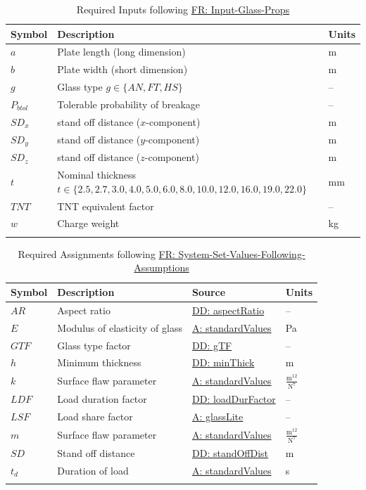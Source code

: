\documentclass[12pt]{article}
\begin{document}
\begin{longtabu}{l X[l] l}
\toprule
\textbf{Symbol} & \textbf{Description} & \textbf{Units}
\\
\midrule
\endhead
$a$ & Plate length (long dimension) & m
\\
$b$ & Plate width (short dimension) & m
\\
$g$ & Glass type $g\in{}\{AN,FT,HS\}$ & --
\\
${P_{btol}}$ & Tolerable probability of breakage & --
\\
${SD_{x}}$ & stand off distance ($x$-component) & m
\\
${SD_{y}}$ & stand off distance ($y$-component) & m
\\
${SD_{z}}$ & stand off distance ($z$-component) & m
\\
$t$ & Nominal thickness $t\in{}\{2.5,2.7,3.0,4.0,5.0,6.0,8.0,10.0,12.0,16.0,19.0,22.0\}$ & mm
\\
$TNT$ & TNT equivalent factor & --
\\
$w$ & Charge weight & kg
\\
\bottomrule
\caption{Required Inputs following \hyperref[inputGlassProps]{FR: Input-Glass-Props}}
\label{Table:ReqInputs}
\end{longtabu}
\begin{longtable}{l l l l}
\toprule
\textbf{Symbol} & \textbf{Description} & \textbf{Source} & \textbf{Units}
\\
\midrule
\endhead
$AR$ & Aspect ratio & \hyperref[DD:aspectRatio]{DD: aspectRatio} & --
\\
$E$ & Modulus of elasticity of glass & \hyperref[assumpSV]{A: standardValues} & Pa
\\
$GTF$ & Glass type factor & \hyperref[DD:gTF]{DD: gTF} & --
\\
$h$ & Minimum thickness & \hyperref[DD:minThick]{DD: minThick} & m
\\
$k$ & Surface flaw parameter & \hyperref[assumpSV]{A: standardValues} & $\frac{\text{m}^{12}}{\text{N}^{7}}$
\\
$LDF$ & Load duration factor & \hyperref[DD:loadDurFactor]{DD: loadDurFactor} & --
\\
$LSF$ & Load share factor & \hyperref[assumpGL]{A: glassLite} & --
\\
$m$ & Surface flaw parameter & \hyperref[assumpSV]{A: standardValues} & $\frac{\text{m}^{12}}{\text{N}^{7}}$
\\
$SD$ & Stand off distance & \hyperref[DD:standOffDist]{DD: standOffDist} & m
\\
${t_{d}}$ & Duration of load & \hyperref[assumpSV]{A: standardValues} & s
\\
\bottomrule
\caption{Required Assignments following \hyperref[sysSetValsFollowingAssumps]{FR: System-Set-Values-Following-Assumptions}}
\label{Table:ReqAssignments}
\end{longtable}
\end{document}
